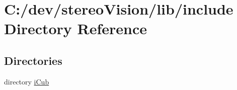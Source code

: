 \section{C\+:/dev/stereo\+Vision/lib/include Directory Reference}
\label{dir_5a30104352ef4255dc24354b02eb2d20}
\subsection*{Directories}
\begin{DoxyCompactItemize}
\item 
directory \hyperlink{dir_05906369c2d654c318c8e5f0b9121080}{i\+Cub}
\end{DoxyCompactItemize}
